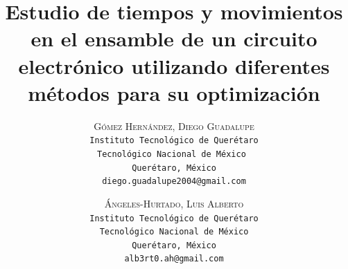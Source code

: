 \lfoot{ \thepage}

\setlength{\droptitle}{-5\baselineskip} %
\title{\textbf{Estudio de tiempos y movimientos en el ensamble de un circuito electrónico utilizando diferentes métodos para su optimización }} %

 \author{ 
 \textsc{Gómez Hernández, Diego Guadalupe}\\ 
 \texttt{ Instituto Tecnológico de Querétaro } \\ 
 \texttt{Tecnológico Nacional de México } \\ 
 \texttt{Querétaro, México}\\ 
 \texttt{diego.guadalupe2004@gmail.com} 
 \and 
 \textsc{Ángeles-Hurtado, Luis Alberto}\\ 
 \texttt{ Instituto Tecnológico de Querétaro } \\ 
 \texttt{ Tecnológico Nacional de México } \\ 
 \texttt{Querétaro, México}\\ 
 \texttt{alb3rt0.ah@gmail.com} 
}



% 

\maketitle
\thispagestyle{fancy}

